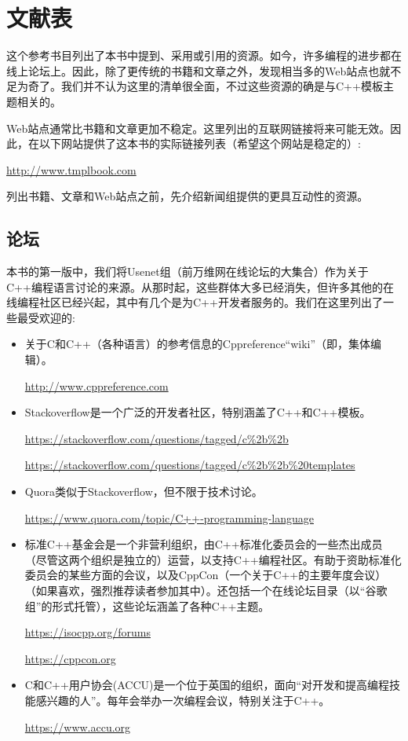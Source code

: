 \chapter{文献表}

这个参考书目列出了本书中提到、采用或引用的资源。如今，许多编程的进步都在线上论坛上。因此，除了更传统的书籍和文章之外，发现相当多的Web站点也就不足为奇了。我们并不认为这里的清单很全面，不过这些资源的确是与C++模板主题相关的。

Web站点通常比书籍和文章更加不稳定。这里列出的互联网链接将来可能无效。因此，在以下网站提供了这本书的实际链接列表（希望这个网站是稳定的）:

\url{http://www.tmplbook.com}

列出书籍、文章和Web站点之前，先介绍新闻组提供的更具互动性的资源。

\section*{论坛}

本书的第一版中，我们将Usenet组（前万维网在线论坛的大集合）作为关于C++编程语言讨论的来源。从那时起，这些群体大多已经消失，但许多其他的在线编程社区已经兴起，其中有几个是为C++开发者服务的。我们在这里列出了一些最受欢迎的:

\begin{itemize}
\item 
关于C和C++（各种语言）的参考信息的Cppreference“wiki”（即，集体编辑）。

\url{http://www.cppreference.com}

\item
Stackoverflow是一个广泛的开发者社区，特别涵盖了C++和C++模板。

\url{https://stackoverflow.com/questions/tagged/c%2b%2b}

\url{https://stackoverflow.com/questions/tagged/c%2b%2b%20templates}

\item
Quora类似于Stackoverflow，但不限于技术讨论。

\url{https://www.quora.com/topic/C++-programming-language}

\item
标准C++基金会是一个非营利组织，由C++标准化委员会的一些杰出成员（尽管这两个组织是独立的）运营，以支持C++编程社区。有助于资助标准化委员会的某些方面的会议，以及CppCon（一个关于C++的主要年度会议）（如果喜欢，强烈推荐读者参加其中）。还包括一个在线论坛目录（以“谷歌组”的形式托管），这些论坛涵盖了各种C++主题。

\url{https://isocpp.org/forums}

\url{https://cppcon.org}

\item
C和C++用户协会(ACCU)是一个位于英国的组织，面向“对开发和提高编程技能感兴趣的人”。每年会举办一次编程会议，特别关注于C++。

\url{https://www.accu.org}
\end{itemize}

